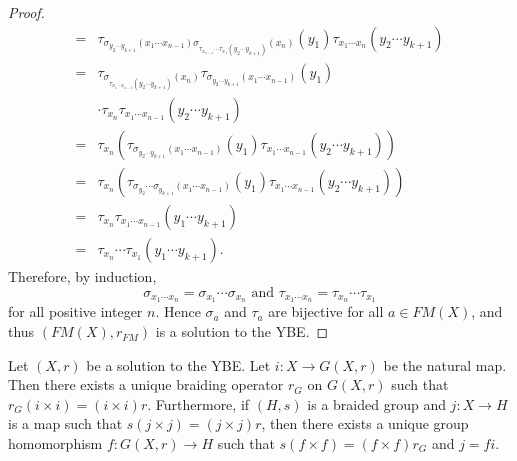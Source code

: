 \begin{proof}
\begin{align*}
    =&\tau_{\sigma_{y_2\cdots y_{k+1}}(x_1\cdots x_{n-1})\sigma_{\tau_{x_{n-1}}\cdots\tau_{x_{1}}(y_{2}\cdots y_{k+1})}(x_n)}(y_{1})\tau_{x_1\cdots x_n}(y_2\cdots y_{k+1})\\
    =&\tau_{\sigma_{\tau_{x_{1}\cdots x_{n-1}}(y_{2}\cdots y_{k+1})}(x_n)}\tau_{\sigma_{y_2\cdots y_{k+1}}(x_1\cdots x_{n-1})}(y_{1})\\
    &\cdot\tau_{x_n}\tau_{x_1\cdots x_{n-1}}(y_2\cdots y_{k+1})\\
    =&\tau_{x_n}\left(\tau_{\sigma_{y_2\cdots y_{k+1}}(x_1\cdots x_{n-1})}(y_{1})\tau_{x_1\cdots x_{n-1}}(y_2\cdots y_{k+1})\right)\\
    =&\tau_{x_n}\left(\tau_{\sigma_{y_2}\cdots\sigma_{y_{k+1}}(x_1\cdots x_{n-1})}(y_{1})\tau_{x_1\cdots x_{n-1}}(y_2\cdots y_{k+1})\right)\\
    =&\tau_{x_n}\tau_{x_1\cdots x_{n-1}}(y_1\cdots y_{k+1})\\
    =&\tau_{x_n}\cdots\tau_{x_1}(y_1\cdots y_{k+1}).
    \end{align*}
Therefore, by induction,
\[\sigma_{x_1\cdots x_n}=\sigma_{x_1}\cdots\sigma_{x_n}\text{ and }\tau_{x_1\cdots x_n}=\tau_{x_n}\cdots \tau_{x_1}\]
for all positive integer $n$. Hence $\sigma_a$ and $\tau_a$ are bijective for all $a\in FM(X)$, and thus $(FM(X),r_{FM})$ is a solution to the YBE.
\end{proof}

\begin{theorem}
\label{thm:LYZ9}
Let $(X,r)$ be a solution to the YBE. Let $i\colon X\rightarrow G(X,r)$ be the natural map. Then there exists a unique braiding operator $r_G$ on $G(X,r)$ such that $r_G (i\times i)=(i\times i) r$. Furthermore, if $(H,s)$ is a braided group and $j\colon X\rightarrow H$ is a map such that
$s (j\times j)=(j\times j) r$, then there exists a unique group homomorphism $f\colon G(X,r)\rightarrow H$ such that $s (f\times f)=(f\times f) r_G$ and $j=f i$.
\end{theorem}

